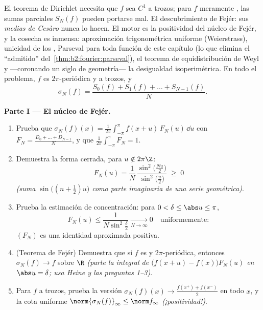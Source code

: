 \begin{problem}\label{pb:b2:fourier:1}
El teorema de Dirichlet necesita que $f$ sea $C^1$ a trozos; para $f$
meramente , las sumas parciales $S_N(f)$ pueden portarse mal.
El descubrimiento de Fejér: sus \emph{medias de Cesàro} nunca lo
hacen. El motor es la positividad del núcleo de Fejér, y la cosecha
es inmensa: aproximación trigonométrica uniforme (Weierstrass),
unicidad de los , Parseval para toda función
de este capítulo (lo que elimina el ``admitido'' del~\cref{thm:b2:fourier:parseval}), el teorema de equidistribución de
Weyl y ---coronando un siglo de geometría--- la desigualdad
isoperimétrica. En
todo el problema, $f$ es $2\pi$-periódica y  a trozos, y
\[
\sigma_N(f) = \frac{S_0(f) + S_1(f) + \dots +
S_{N-1}(f)}{N} .
\]

\medskip
\noindent\textbf{Parte I --- El núcleo de Fejér.}
\begin{enumerate}
  \item Prueba que $\sigma_N(f)(x) =
        \frac{1}{2\pi}\int_{-\pi}^{\pi}f(x+u)\,F_N(u)\,\dd u$ con
        $F_N = \frac{D_0 + \dots + D_{N-1}}{N}$, y que
        $\frac{1}{2\pi}\int_{-\pi}^{\pi}F_N = 1$.
  \item Demuestra la forma cerrada, para $u \notin 2\pi\Z$:
        \[
        F_N(u) = \frac{1}{N}\,
        \frac{\sin^2\bigl(\frac{Nu}{2}\bigr)}
        {\sin^2\bigl(\frac u2\bigr)} \;\geq\; 0
        \]
        \emph{(suma $\sin\bigl((n+\frac12)u\bigr)$ como parte
        imaginaria de una serie geométrica)}.
  \item Prueba la estimación de concentración: para $0 < \delta \leq
        \abs u \leq \pi$,
        \[
        F_N(u) \leq \frac{1}{N\sin^2\frac\delta2}
        \xrightarrow[N\to\infty]{} 0
        \quad\text{uniformemente} :
        \]
        $(F_N)$ es una identidad aproximada positiva.
  \item (Teorema de Fejér) Demuestra que si $f$ es  y
        $2\pi$-periódica, entonces $\sigma_N(f) \to f$
        \emph{} sobre $\R$ \emph{(parte la integral de
        $\bigl(f(x+u) - f(x)\bigr)F_N(u)$ en $\abs u = \delta$; usa
        Heine y las preguntas 1--3)}.
  \item Para $f$  a trozos, prueba la versión 
        $\sigma_N(f)(x) \to \frac{f(x^+) + f(x^-)}{2}$ en todo $x$, y
        la cota uniforme $\norm{\sigma_N(f)}_\infty \leq \norm
        f_\infty$ \emph{(¡positividad!)}.
\end{enumerate}


\end{problem}
